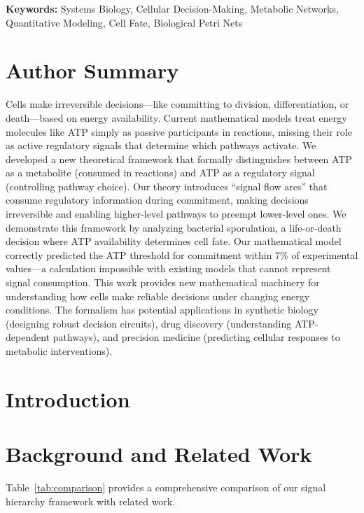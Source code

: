 \documentclass[10pt,letterpaper]{article}
\begin{document}
\vspace{6pt}
\noindent\textbf{Keywords:} Systems Biology, Cellular Decision-Making, Metabolic Networks, Quantitative Modeling, Cell Fate, Biological Petri Nets

\section*{Author Summary}
Cells make irreversible decisions---like committing to division, differentiation, or death---based on energy availability. Current mathematical models treat energy molecules like ATP simply as passive participants in reactions, missing their role as active regulatory signals that determine which pathways activate. We developed a new theoretical framework that formally distinguishes between ATP as a metabolite (consumed in reactions) and ATP as a regulatory signal (controlling pathway choice). Our theory introduces ``signal flow arcs'' that consume regulatory information during commitment, making decisions irreversible and enabling higher-level pathways to preempt lower-level ones. We demonstrate this framework by analyzing bacterial sporulation, a life-or-death decision where ATP availability determines cell fate. Our mathematical model correctly predicted the ATP threshold for commitment within 7\% of experimental values---a calculation impossible with existing models that cannot represent signal consumption. This work provides new mathematical machinery for understanding how cells make reliable decisions under changing energy conditions. The formalism has potential applications in synthetic biology (designing robust decision circuits), drug discovery (understanding ATP-dependent pathways), and precision medicine (predicting cellular responses to metabolic interventions).

\section{Introduction}



\section{Background and Related Work}



Table~\ref{tab:comparison} provides a comprehensive comparison of our signal hierarchy framework with related work.
\end{document}
